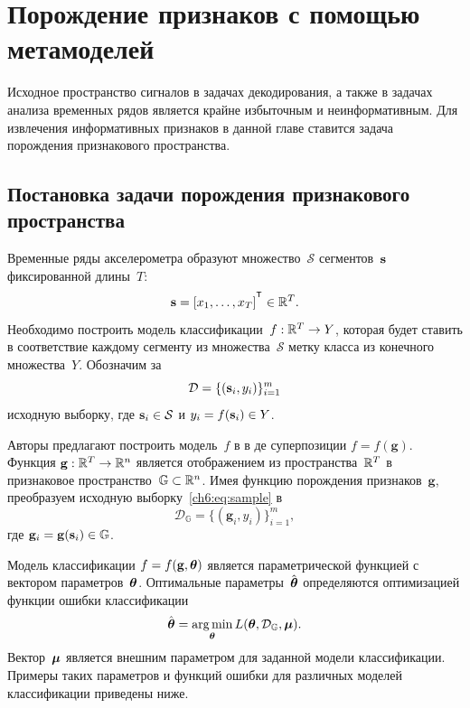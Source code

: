 \chapter{Порождение признаков с помощью метамоделей}
\label{ch:metamodels}

Исходное пространство сигналов в задачах декодирования, а также в задачах анализа временных рядов является крайне избыточным и неинформативным.
Для извлечения информативных признаков в данной главе ставится задача порождения признакового пространства.

\section{Постановка задачи порождения признакового пространства}
\label{sec:ch6:feature_generation}

Временные ряды акселерометра образуют множество~$\mathcal{S}$ сегментов~$\mathbf{s}$ фиксированной длины~$T$:
\[
	\bs = [x_1, \dots, x_T]^{\T} \in \bbR^T.
\]
Необходимо построить модель классификации~$f: \mathbb{R}^T \rightarrow Y$, которая будет ставить в соответствие каждому сегменту из множества~$\mathcal{S}$ метку класса из конечного множества~$Y$.
Обозначим за
\begin{equation}
	\mathcal{D} = \{(\mathbf{s}_i, y_i)\}_{i=1}^m
	\label{ch6:eq:sample}
\end{equation}
исходную выборку, где $\mathbf{s}_i \in \mathcal{S}$ и $y_i = f(\mathbf{s}_i)\in Y$.

Авторы предлагают построить модель~$f$ в в де суперпозиции $f=f(\mathbf{g})$.
Функция $\mathbf{g}: \mathbb{R}^T \rightarrow \mathbb{R}^n$ является отображением из пространства~$\mathbb{R}^{T} $ в признаковое пространство~$\mathbb{G} \subset \mathbb{R}^n$.
Имея функцию порождения признаков~$\mathbf{g}$, преобразуем исходную выборку~\eqref{ch6:eq:sample} в
\[
	\mathcal{D}_\mathbb{G} = \{(\mathbf{g}_i, y_i)\}_{i=1}^m,
\]
где $\mathbf{g}_i = \mathbf{g}(\mathbf{s}_i) \in \mathbb{G}$. 

Модель классификации $f=f(\mathbf{g}, \boldsymbol{\theta})$ является параметрической функцией с вектором параметров~$\boldsymbol{\theta}$. 
Оптимальные параметры~$\hat{\boldsymbol{\theta}}$ определяются оптимизацией функции ошибки классификации
\begin{equation}
	\hat{\boldsymbol{\theta}} = \mathop{\arg \min}\limits_{\boldsymbol{\theta}} L(\boldsymbol{\theta}, \mathcal{D}_\mathbb{G}, \boldsymbol{\mu}).
	\label{ch6:eq:optimal_classification_params}
\end{equation}
Вектор~$\boldsymbol{\mu}$ является внешним параметром для заданной модели классификации. 
Примеры таких параметров и функций ошибки для различных моделей классификации приведены ниже.

